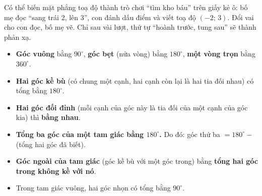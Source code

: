 \begin{parentbox}
Có thể biến mặt phẳng toạ độ thành trò chơi ``tìm kho báu'' trên giấy kẻ ô: bố mẹ đọc ``sang trái 2, lên 3'', con đánh dấu điểm và viết toạ độ $(-2;\,3)$. Đổi vai cho con đọc, bố mẹ vẽ. Chỉ sau vài lượt, thứ tự ``hoành trước, tung sau'' sẽ thành phản xạ.
\end{parentbox}

\begin{knowbox}
\begin{itemize}[leftmargin=1.3em,itemsep=2pt,topsep=2pt]
  \item \textbf{Góc vuông} bằng $90^\circ$, \textbf{góc bẹt} (nửa vòng) bằng $180^\circ$, \textbf{một vòng trọn} bằng $360^\circ$.
  \item \textbf{Hai góc kề bù} (có chung một cạnh, hai cạnh còn lại là hai tia đối nhau) có tổng bằng $180^\circ$.
  \item \textbf{Hai góc đối đỉnh} (mỗi cạnh của góc này là tia đối của một cạnh của góc kia) thì \textbf{bằng nhau}.
  \item \textbf{Tổng ba góc của một tam giác bằng $180^\circ$.} Do đó: góc thứ ba $=180^\circ-$ (tổng hai góc đã biết).
  \item \textbf{Góc ngoài của tam giác} (góc kề bù với một góc trong) bằng \textbf{tổng hai góc trong không kề với nó}.
  \item Trong tam giác vuông, hai góc nhọn có tổng bằng $90^\circ$.
\end{itemize}
\end{knowbox}

